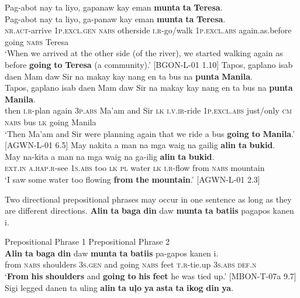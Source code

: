 \ea 
Pag-abot  nay  ta  liyo,  gapanaw  kay eman  \textbf{munta}  \textbf{ta}  \textbf{Teresa}. \\\smallskip
 \gll Pag-abot  nay  ta  liyo,  ga-panaw  kay eman  \textbf{munta}  \textbf{ta}  \textbf{Teresa}. \\
\textsc{nr.act}-arrive  1\textsc{p.excl.gen}  \textsc{nabs}  otherside  \textsc{i.r}-go/walk  1\textsc{p.excl.abs}
again.as.before  going  \textsc{nabs}  Teresa \\
\glt `When we arrived at the other side (of the river), we started walking again as before \textbf{going} \textbf{to} \textbf{Teresa} (a community).’ [BGON-L-01 1.10]
\z
\ea
\label{bkm:Ref480806358}
Tapos,  gaplano  isab  daen  Mam  daw  Sir  na  makay kay  nang  en  ta  bus  na  \textbf{punta}  \textbf{Manila}. \\\smallskip
\gll Tapos,  gaplano  isab  daen  Mam  daw  Sir  na  makay kay  nang  en  ta  bus  na  \textbf{punta}  \textbf{Manila}. \\
then  \textsc{i.r}-plan  again  3\textsc{p.abs}  Ma’am  and  Sir  \textsc{lk}  \textsc{i.v.ir}-ride
1\textsc{p.excl.abs} just/only  \textsc{cm}  \textsc{nabs}  bus  \textsc{lk}  going  Manila \\
\glt `Then Ma’am and Sir were planning again that we ride a bus \textbf{going} \textbf{to} \textbf{Manila}.’ [AGWN-L-01 6.5]
\z
\ea
May  nakita  a  man  na  mga  waig  na  gailig \textbf{alin}  \textbf{ta}  \textbf{bukid}. \\\smallskip
 \gll May  na-kita  a  man  na  mga  waig  na  ga-ilig \textbf{alin}  \textbf{ta}  \textbf{bukid}. \\
\textsc{ext.in}  \textsc{a.hap.r}-see  1\textsc{s.abs}  too  \textsc{lk}  \textsc{pl}  water  \textsc{lk}  \textsc{i.r}-flow from  \textsc{nabs}  mountain \\
\glt `I saw some water too flowing \textbf{from} \textbf{the} \textbf{mountain}.’ [AGWN-L-01 2.3]
\z


Two directional prepositional phrases may occur in one sentence as long as they are different directions.
\ea
\textbf{Alin}  \textbf{ta}  \textbf{baga}  \textbf{din}  daw  \textbf{munta}  \textbf{ta}  \textbf{batiis}  pagapos  kanen  i. \\\smallskip

Prepositional Phrase 1 \hspace{1.6cm}   Prepositional Phrase 2 \\
\gll \textbf{Alin}  \textbf{ta}  \textbf{baga}  \textbf{din}  daw  \textbf{munta}  \textbf{ta}  \textbf{batiis}  pa-gapos  kanen  i. \\
from  \textsc{nabs}  shoulders  3\textsc{s.gen}  and  going  \textsc{nabs}  feet  \textsc{t.r}-tie.up  3\textsc{s.abs}  \textsc{def.n} \\
\glt ‘\textbf{From} \textbf{his} \textbf{shoulders} and \textbf{going} \textbf{to} \textbf{his} \textbf{feet} he was tied up.’ [MBON-T-07a 9.7]
\z
\ea
Sigi  legged  danen  ta  uling  \textbf{alin}  \textbf{ta}  \textbf{uļo} \textbf{ya} \textbf{asta}  \textbf{ta}  \textbf{ikog}  \textbf{din}  \textbf{ya}. \\\smallskip

